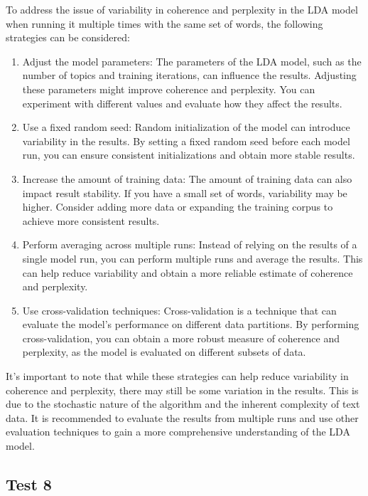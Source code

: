 \documentclass[10pt]{article} %
\begin{document}
	To address the issue of variability in coherence and perplexity in the LDA model when running it multiple times with the same set of words, the following strategies can be considered:
	\begin{enumerate}
		\item Adjust the model parameters: The parameters of the LDA model, such as the number of topics and training iterations, can influence the results. Adjusting these parameters might improve coherence and perplexity. You can experiment with different values and evaluate how they affect the results.
		
		\item Use a fixed random seed: Random initialization of the model can introduce variability in the results. By setting a fixed random seed before each model run, you can ensure consistent initializations and obtain more stable results.
		
		\item Increase the amount of training data: The amount of training data can also impact result stability. If you have a small set of words, variability may be higher. Consider adding more data or expanding the training corpus to achieve more consistent results.
		
		\item Perform averaging across multiple runs: Instead of relying on the results of a single model run, you can perform multiple runs and average the results. This can help reduce variability and obtain a more reliable estimate of coherence and perplexity.
		
		\item Use cross-validation techniques: Cross-validation is a technique that can evaluate the model's performance on different data partitions. By performing cross-validation, you can obtain a more robust measure of coherence and perplexity, as the model is evaluated on different subsets of data.
	\end{enumerate}

	It's important to note that while these strategies can help reduce variability in coherence and perplexity, there may still be some variation in the results. This is due to the stochastic nature of the algorithm and the inherent complexity of text data. It is recommended to evaluate the results from multiple runs and use other evaluation techniques to gain a more comprehensive understanding of the LDA model.
	
	\subsection{Test 8}
	
\end{document}
